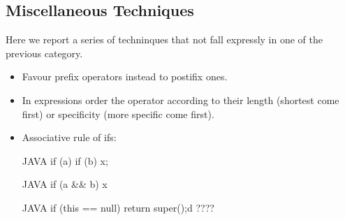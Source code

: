 \subsection{Miscellaneous Techniques}

Here we report a series of techninques that not fall expressly in one of the previous category.

\begin{itemize}
\item Favour prefix operators instead to postifix ones.
\item In expressions order the operator according to their length (shortest come first)
or specificity (more specific come first).

\item Associative rule of ifs: 
  \begin{code}{JAVA}
if (a) if (b) x;
\end{code}
  \begin{code}{JAVA}
if (a && b) x
  \end{code}
\begin{code}{JAVA}
if (this == null) return super();d
????\end{code}
  
\end{itemize}

